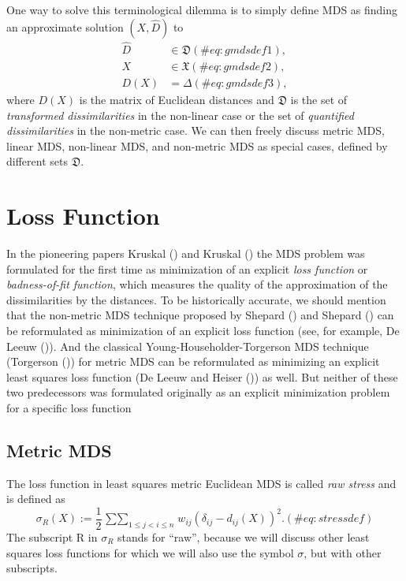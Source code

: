 \documentclass[
  12pt,
  letterpaper,
  DIV=11,
  numbers=noendperiod]{scrartcl}
\begin{document}
One way to solve this terminological dilemma is to simply define MDS as
finding an approximate solution \((X,\hat D)\) to \begin{subequations}
\begin{align}
\hat D&\in\mathfrak{D}(\#eq:gmdsdef1),\\
X&\in\mathfrak{X}(\#eq:gmdsdef2),\\
D(X)&=\Delta(\#eq:gmdsdef3),
\end{align}
\end{subequations} where \(D(X)\) is the matrix of Euclidean distances
and \(\mathfrak{D}\) is the set of \emph{transformed dissimilarities} in
the non-linear case or the set of \emph{quantified dissimilarities} in
the non-metric case. We can then freely discuss metric MDS, linear MDS,
non-linear MDS, and non-metric MDS as special cases, defined by
different sets \(\mathfrak{D}\).

\section{Loss Function}\label{loss-function}

In the pioneering papers Kruskal () and
Kruskal () the MDS problem was
formulated for the first time as minimization of an explicit \emph{loss
function} or \emph{badness-of-fit function}, which measures the quality
of the approximation of the dissimilarities by the distances. To be
historically accurate, we should mention that the non-metric MDS
technique proposed by Shepard () and
Shepard () can be reformulated as
minimization of an explicit loss function (see, for example, De Leeuw
()). And the classical
Young-Householder-Torgerson MDS technique (Torgerson
()) for metric MDS can be reformulated
as minimizing an explicit least squares loss function (De Leeuw and
Heiser ()) as well. But neither
of these two predecessors was formulated originally as an explicit
minimization problem for a specific loss function

\subsection{Metric MDS}\label{metric-mds}

The loss function in least squares metric Euclidean MDS is called
\emph{raw stress} and is defined as \begin{equation}
\sigma_R(X):=\frac12\mathop{\sum\sum}_{1\leq j<i\leq n}w_{ij}(\delta_{ij}-d_{ij}(X))^2.
(\#eq:stressdef)
\end{equation} The subscript R in \(\sigma_R\) stands for ``raw'',
because we will discuss other least squares loss functions for which we
will also use the symbol \(\sigma\), but with other subscripts.
\end{document}
